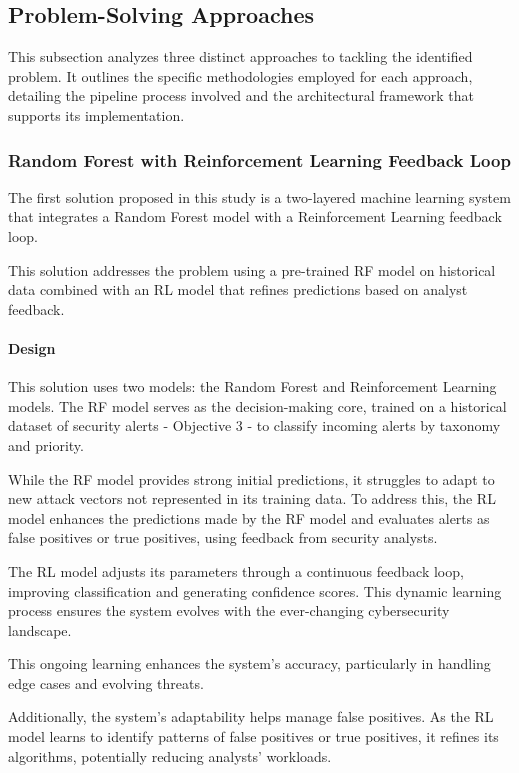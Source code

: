 \subsection{Problem-Solving Approaches}
This subsection analyzes three distinct approaches to tackling the identified problem. 
It outlines the specific methodologies employed for each approach, detailing the pipeline process involved and the architectural framework that supports its implementation.

\subsubsection{Random Forest with Reinforcement Learning Feedback Loop}

The first solution proposed in this study is a two-layered machine learning system that integrates a Random Forest model with a Reinforcement Learning feedback loop. 

This solution addresses the problem using a pre-trained RF model on historical data combined with an RL model that refines predictions based on analyst feedback.

\paragraph{Design}

This solution uses two models: the Random Forest and Reinforcement Learning models. 
The RF model serves as the decision-making core, trained on a historical dataset of security alerts  - Objective 3 - to classify incoming alerts by taxonomy and priority.

While the RF model provides strong initial predictions, it struggles to adapt to new attack vectors not represented in its training data. 
To address this, the RL model enhances the predictions made by the RF model and evaluates alerts as false positives or true positives, using feedback from security analysts.

The RL model adjusts its parameters through a continuous feedback loop, improving classification and generating confidence scores. 
This dynamic learning process ensures the system evolves with the ever-changing cybersecurity landscape.

This ongoing learning enhances the system's accuracy, particularly in handling edge cases and evolving threats.

Additionally, the system's adaptability helps manage false positives. As the RL model learns to identify patterns of false positives or true positives, it refines its algorithms, potentially reducing analysts' workloads.

